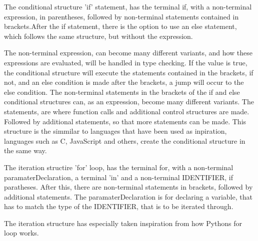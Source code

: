 The conditional structure 'if' statement, has the terminal if, with a non-terminal expression, in parentheses, followed by non-terminal statements contained in brackets.After the if statement, there is the option to use an else statement, which follows the same structure, but without the expression.

The non-terminal expression, can become many different variants, and how these expressions are evaluated, will be handled in type checking. If the value is true, the conditional structure will execute the statements contained in the brackets, if not, and an else condition is made after the brackets, a jump will occur to the else condition.
The non-terminal statements in the brackets of the if and else conditional structures can, as an expression, become many different variants. The statements, are where function calls and additional control structures are made.
Followed by additional statements, so that more statements can be made.
This structure is the simmilar to languages that have been used as inpiration, languages such as C, JavaScript and others, create the conditional structure in the same way.

The iteration structire 'for' loop, has the terminal for, with a non-terminal paramaterDeclaration, a terminal 'in' and a non-terminal IDENTIFIER, if paratheses. After this, there are non-terminal statements in brackets, followed by additional statements.
The paramaterDeclaration is for declaring a variable, that has to match the type of the IDENTIFIER, that is to be iterated through.

The iteration structure has especially taken inspiration from how Pythons for loop works. 